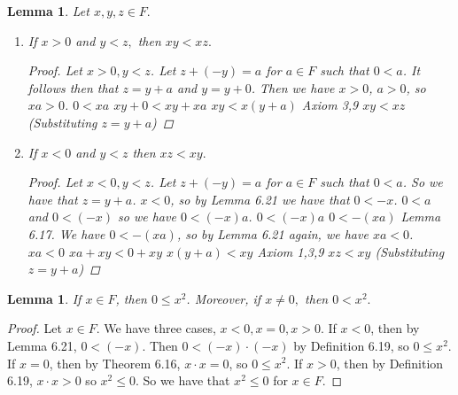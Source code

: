 \documentclass[12pt]{article}
\renewcommand{\_}[1]{\underline{ #1 }}
\newtheorem{lemma}[theorem]{Lemma}
\theoremstyle{definition}
\numberwithin{equation}{subsection}
\begin{document}
\begin{lemma} Let $x,y,z\in F.$ 
\begin{enumerate}
\item If $ x>0$ and $y<z,$ then $xy<xz.$

\begin{proof}
Let $x > 0, y < z$. Let $z + (-y) = a$ for $a \in F$ such that $0 < a$. It follows then that $z = y + a$ and $y = y + 0$. Then we have $x > 0$, $a > 0$, so $xa > 0$. \newline
$0 < xa$ \newline
$xy + 0 < xy + xa$ \newline
$xy < x(y + a)$ Axiom 3,9 \newline
$xy < xz$ (Substituting $z = y + a$) 
\end{proof}

\item If $x<0$ and $y<z$ then $xz<xy.$

\begin{proof}
Let $x < 0, y < z$. Let $z + (-y) = a$ for $a \in F$ such that $0 < a$. So we have that $z = y + a$. $x < 0$, so by Lemma 6.21 we have that $0 < -x$. $0 < a$ and $0 < (-x)$ so we have $0 < (-x)a$. \newline
$0 < (-x)a$ \newline
$0 < -(xa)$ Lemma 6.17.
We have $0 < -(xa)$, so by Lemma 6.21 again, we have $xa < 0$. \newline
$xa < 0$ \newline
$xa + xy < 0 + xy$ \newline
$x(y + a) < xy$ Axiom 1,3,9 \newline
$xz < xy$ (Substituting $z = y + a$)
\end{proof}

\end{enumerate}
\end{lemma}

\begin{lemma}  If $x\in F$, then $0 \leq x^2$.  Moreover, if $x\neq 0,$ then $0<x^2.$
\end{lemma}

\begin{proof}
Let $x \in F$. We have three cases, $x < 0, x = 0, x >0$. \newline
If $x < 0$, then by Lemma 6.21, $0 < (-x)$. Then $0 < (-x) \cdot (-x)$ by Definition 6.19, so $0 \leq x^2$. \newline
If $x = 0$, then by Theorem 6.16, $x \cdot x = 0$, so $0 \leq x^2$. \newline
If $x > 0$, then by Definition 6.19, $x \cdot x > 0$ so $x^2 \leq 0$. \newline
So we have that $x^2 \leq 0$ for $x \in F$.
\end{proof}
\end{document}
